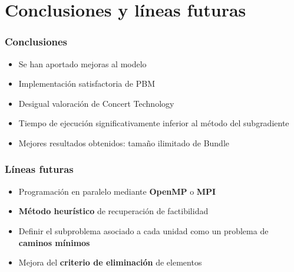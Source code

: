 \documentclass[xcolor=dvipsnames, utf8, spanish]{beamer} %
\begin{document}
\section{Conclusiones y líneas futuras}

\begin{frame}
	\frametitle{Conclusiones}
	\begin{itemize}
		\item Se han aportado mejoras al modelo
		\item Implementación satisfactoria de PBM
		\item Desigual valoración de Concert Technology
		\item Tiempo de ejecución significativamente inferior al método del subgradiente
		\item Mejores resultados obtenidos: tamaño ilimitado de Bundle
	\end{itemize}
\end{frame}

\begin{frame}
	\frametitle{Líneas futuras}
	\begin{itemize}
		\item Programación en paralelo mediante \textbf{OpenMP} o \textbf{MPI}
		\item \textbf{Método heurístico} de recuperación de factibilidad
		\item Definir el subproblema asociado a cada unidad como un problema de \textbf{caminos mínimos}
		\item Mejora del \textbf{criterio de eliminación} de elementos
	\end{itemize}
\end{frame}
\end{document}
